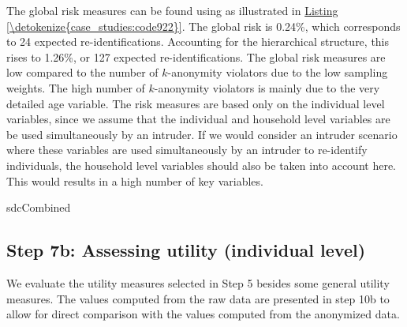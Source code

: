 \documentclass[letterpaper,10pt,english]{sphinxmanual}
\begin{document}
The global risk measures can be found using  as illustrated in
\hyperref[\detokenize{case_studies:code922}]{Listing \ref{\detokenize{case_studies:code922}}}. The global risk is 0.24\%, which corresponds to 24 expected
re-identifications. Accounting for the hierarchical structure, this
rises to 1.26\%, or 127 expected re-identifications. The global risk
measures are low compared to the number of \(k\)-anonymity violators due to
the low sampling weights. The high number of \(k\)-anonymity violators is
mainly due to the very detailed age variable. The risk measures are
based only on the individual level variables, since we assume that the
individual and household level variables are be used simultaneously by
an intruder. If we would consider an intruder scenario where these
variables are used simultaneously by an intruder to re-identify
individuals, the household level variables should also be taken into
account here. This would results in a high number of key variables.

\def\sphinxLiteralBlockLabel{\label{\detokenize{case_studies:code922}}}
%
\begin{sphinxVerbatim}[commandchars=\\\{\},numbers=left,firstnumber=1,stepnumber=1]
sdcCombined 
\end{sphinxVerbatim}


\subsection{Step 7b: Assessing utility (individual level)}
\label{\detokenize{case_studies:step-7b-assessing-utility-individual-level}}
We evaluate the utility measures selected in Step 5 besides some general
utility measures. The values computed from the raw data are presented in
step 10b to allow for direct comparison with the values computed from
the anonymized data.
\end{document}
